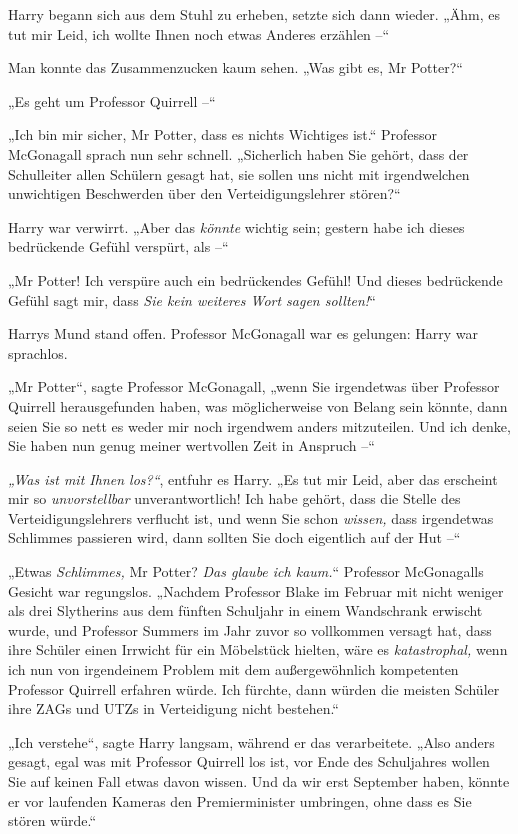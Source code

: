 {Harry begann sich aus dem Stuhl zu erheben, setzte sich dann wieder. „Ähm, es tut mir Leid, ich wollte Ihnen noch etwas Anderes erzählen --“

Man konnte das Zusammenzucken kaum sehen. „Was gibt es, Mr Potter?“

„Es geht um Professor Quirrell --“

„Ich bin mir sicher, Mr Potter, dass es nichts Wichtiges ist.“ Professor McGonagall sprach nun sehr schnell. „Sicherlich haben Sie gehört, dass der Schulleiter allen Schülern gesagt hat, sie sollen uns nicht mit irgendwelchen unwichtigen Beschwerden über den Verteidigungslehrer stören?“

Harry war verwirrt. „Aber das \emph{könnte} wichtig sein; gestern habe ich dieses bedrückende Gefühl verspürt, als --“

„Mr Potter! Ich verspüre auch ein bedrückendes Gefühl! Und dieses bedrückende Gefühl sagt mir, dass \emph{Sie kein weiteres Wort sagen sollten!}“

Harrys Mund stand offen. Professor McGonagall war es gelungen: Harry war sprachlos.

„Mr Potter“, sagte Professor McGonagall, „wenn Sie irgendetwas über Professor Quirrell herausgefunden haben, was möglicherweise von Belang sein könnte, dann seien Sie so nett es weder mir noch irgendwem anders mitzuteilen. Und ich denke, Sie haben nun genug meiner wertvollen Zeit in Anspruch --“

\emph{„Was ist mit Ihnen los?“}, entfuhr es Harry. „Es tut mir Leid, aber das erscheint mir so \emph{unvorstellbar} unverantwortlich! Ich habe gehört, dass die Stelle des Verteidigungslehrers verflucht ist, und wenn Sie schon \emph{wissen,} dass irgendetwas Schlimmes passieren wird, dann sollten Sie doch eigentlich auf der Hut --“

„Etwas \emph{Schlimmes,} Mr Potter? \emph{Das glaube ich kaum.}“ Professor McGonagalls Gesicht war regungslos. „Nachdem Professor Blake im Februar mit nicht weniger als drei Slytherins aus dem fünften Schuljahr in einem Wandschrank erwischt wurde, und Professor Summers im Jahr zuvor so vollkommen versagt hat, dass ihre Schüler einen Irrwicht für ein Möbelstück hielten, wäre es \emph{katastrophal,} wenn ich nun von irgendeinem Problem mit dem außergewöhnlich kompetenten Professor Quirrell erfahren würde. Ich fürchte, dann würden die meisten Schüler ihre ZAGs und UTZs in Verteidigung nicht bestehen.“

„Ich verstehe“, sagte Harry langsam, während er das verarbeitete. „Also anders gesagt, egal was mit Professor Quirrell los ist, vor Ende des Schuljahres wollen Sie auf keinen Fall etwas davon wissen. Und da wir erst September haben, könnte er vor laufenden Kameras den Premierminister umbringen, ohne dass es Sie stören würde.“

}
